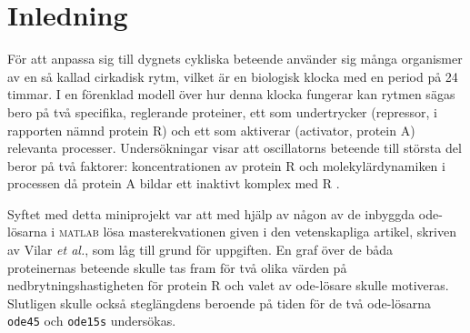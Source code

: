 \section{Inledning}
För att anpassa sig till dygnets cykliska beteende använder sig många organismer av en så kallad cirkadisk rytm, vilket är en biologisk klocka med en period på 24 timmar. I en förenklad modell över hur denna klocka fungerar kan rytmen sägas bero på två specifika, reglerande proteiner, ett som undertrycker (repressor, i rapporten nämnd protein R) och ett som aktiverar (activator, protein A) relevanta processer. Undersökningar visar att oscillatorns beteende till största del beror på två faktorer: koncentrationen av protein R och molekylärdynamiken i processen då protein A bildar ett inaktivt komplex med R \cite{ref:rapport}.

Syftet med detta miniprojekt var att med hjälp av någon av de inbyggda ode-lösarna i \textsc{matlab} lösa masterekvationen given i den vetenskapliga artikel, skriven av Vilar \emph{et al.}, som låg till grund för uppgiften. En graf över de båda proteinernas beteende skulle tas fram för två olika värden på nedbrytningshastigheten för protein R och valet av ode-lösare skulle motiveras. Slutligen skulle också steglängdens beroende på tiden för de två ode-lösarna \texttt{ode45} och \texttt{ode15s} undersökas.